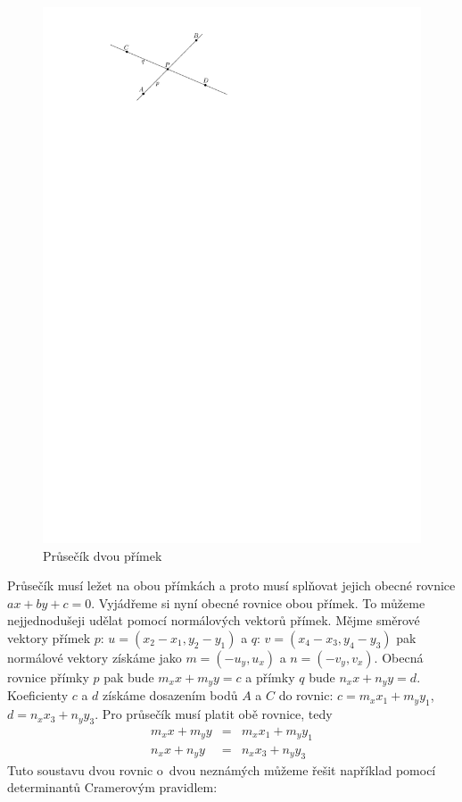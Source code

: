 \begin{figure}[h]
	\centering
	\includegraphics{../img/prusecik.pdf}
	\caption{Průsečík dvou přímek}
	\label{fig:prusecik}
\end{figure}

Průsečík musí ležet na obou přímkách a proto musí splňovat jejich obecné rovnice
$ax+by+c=0$.  Vyjádřeme si nyní obecné rovnice obou přímek. To můžeme
nejjednodušeji udělat pomocí normálových vektorů přímek. Mějme směrové vektory
přímek $p$: $u = (x_2-x_1,y_2-y_1)$ a $q$: $v=(x_4-x_3,y_4-y_3)$ pak normálové
vektory získáme jako $m = (-u_y,u_x)$ a $n = (-v_y,v_x)$. Obecná rovnice přímky
$p$ pak bude $m_xx+m_yy=c$ a přímky $q$ bude $n_xx+n_yy=d$. Koeficienty $c$ a
$d$ získáme dosazením bodů $A$ a $C$ do rovnic: $c = m_xx_1+m_yy_1$,
$d=n_xx_3+n_yy_3$. Pro průsečík musí platit obě rovnice, tedy 
\begin{eqnarray*}
m_xx+m_yy &=& m_xx_1+m_yy_1\\
n_xx+n_yy &=& n_xx_3+n_yy_3
\end{eqnarray*}
Tuto soustavu dvou rovnic o~dvou neznámých můžeme řešit například pomocí
determinantů Cramerovým pravidlem:

